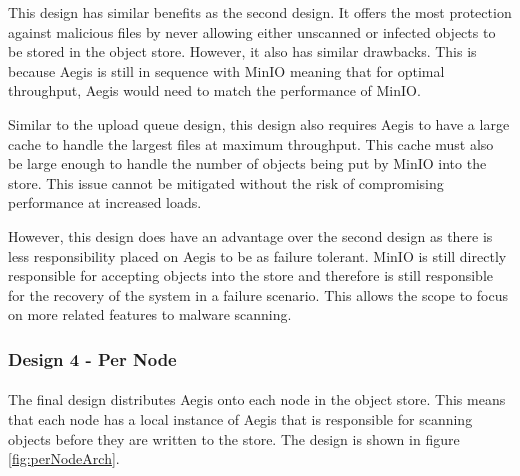 \documentclass[12pt, conference, final, a4paper, onecolumn, compsoc]{IEEEtran}
\begin{document}
    This design has similar benefits as the second design. It offers the most
    protection against malicious files by never allowing either unscanned or
    infected objects to be stored in the object store. However, it also has
    similar drawbacks. This is because Aegis is still in sequence with MinIO
    meaning that for optimal throughput, Aegis would need to match the
    performance of MinIO.

    Similar to the upload queue design, this design also requires Aegis to have
    a large cache to handle the largest files at maximum throughput. This cache
    must also be large enough to handle the number of objects being put by MinIO
    into the store. This issue cannot be mitigated without the risk of
    compromising performance at increased loads.

    However, this design does have an advantage over the second design as there
    is less responsibility placed on Aegis to be as failure tolerant. MinIO is
    still directly responsible for accepting objects into the store and
    therefore is still responsible for the recovery of the system in a failure
    scenario. This allows the scope to focus on more related features to malware
    scanning.


    \subsubsection*{Design 4 - Per Node}
    \paragraph{}

    The final design distributes Aegis onto each node in the object store. This
    means that each node has a local instance of Aegis that is responsible for
    scanning objects before they are written to the store. The design is shown
    in figure \ref{fig:perNodeArch}.
\end{document}
